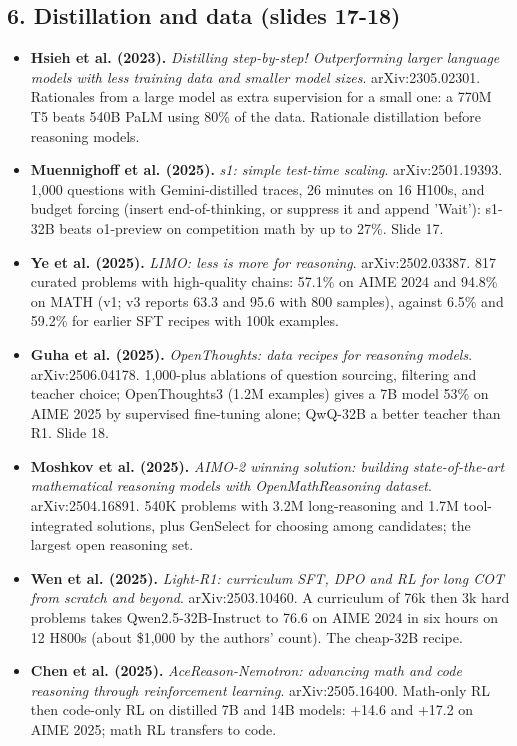 \documentclass[11pt,letterpaper]{article}
\begin{document}
\subsection*{6. Distillation and data (slides 17-18)}
\begin{itemize}[leftmargin=1.2em,itemsep=3pt]\sloppy
\item \textbf{Hsieh et al. (2023).} \textit{Distilling step-by-step! Outperforming larger language models with less training data and smaller model sizes}. arXiv:2305.02301. Rationales from a large model as extra supervision for a small one: a 770M T5 beats 540B PaLM using 80\% of the data. Rationale distillation before reasoning models.
\item \textbf{Muennighoff et al. (2025).} \textit{s1: simple test-time scaling}. arXiv:2501.19393. 1,000 questions with Gemini-distilled traces, 26 minutes on 16 H100s, and budget forcing (insert end-of-thinking, or suppress it and append 'Wait'): s1-32B beats o1-preview on competition math by up to 27\%. Slide 17.
\item \textbf{Ye et al. (2025).} \textit{LIMO: less is more for reasoning}. arXiv:2502.03387. 817 curated problems with high-quality chains: 57.1\% on AIME 2024 and 94.8\% on MATH (v1; v3 reports 63.3 and 95.6 with 800 samples), against 6.5\% and 59.2\% for earlier SFT recipes with 100k examples.
\item \textbf{Guha et al. (2025).} \textit{OpenThoughts: data recipes for reasoning models}. arXiv:2506.04178. 1,000-plus ablations of question sourcing, filtering and teacher choice; OpenThoughts3 (1.2M examples) gives a 7B model 53\% on AIME 2025 by supervised fine-tuning alone; QwQ-32B a better teacher than R1. Slide 18.
\item \textbf{Moshkov et al. (2025).} \textit{AIMO-2 winning solution: building state-of-the-art mathematical reasoning models with OpenMathReasoning dataset}. arXiv:2504.16891. 540K problems with 3.2M long-reasoning and 1.7M tool-integrated solutions, plus GenSelect for choosing among candidates; the largest open reasoning set.
\item \textbf{Wen et al. (2025).} \textit{Light-R1: curriculum SFT, DPO and RL for long COT from scratch and beyond}. arXiv:2503.10460. A curriculum of 76k then 3k hard problems takes Qwen2.5-32B-Instruct to 76.6 on AIME 2024 in six hours on 12 H800s (about \$1,000 by the authors' count). The cheap-32B recipe.
\item \textbf{Chen et al. (2025).} \textit{AceReason-Nemotron: advancing math and code reasoning through reinforcement learning}. arXiv:2505.16400. Math-only RL then code-only RL on distilled 7B and 14B models: +14.6 and +17.2 on AIME 2025; math RL transfers to code.

\end{itemize}
\end{document}
